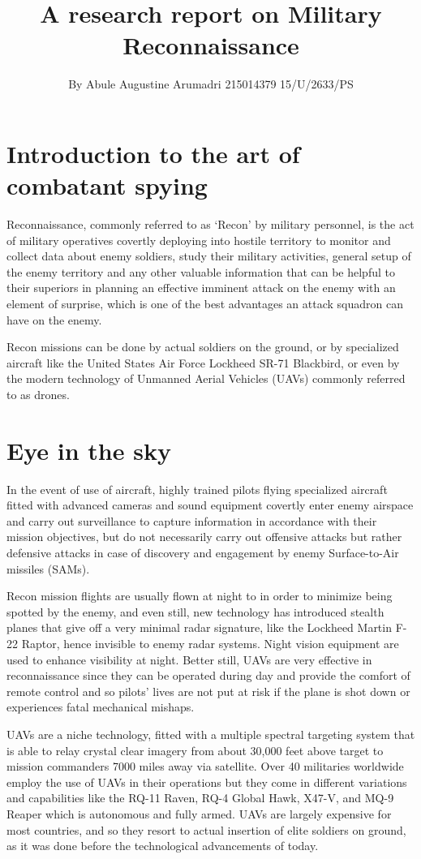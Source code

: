 \documentclass{article}
\title{A research report on Military Reconnaissance}
\author{By Abule Augustine Arumadri 215014379 15/U/2633/PS}
\date{}
\begin{document}
\maketitle
\tableofcontents
\section{Introduction to the art of combatant spying}
Reconnaissance, commonly referred to as ‘Recon’ by military personnel, is the act of military operatives covertly deploying into hostile territory to monitor and collect 
data about enemy soldiers, study their military activities, general setup of the enemy territory and any other valuable information that can be helpful to their superiors
 in planning an effective imminent attack on the enemy with an element of surprise, which is one of the best advantages an attack squadron can have on the enemy.

 Recon missions can be done by actual soldiers on the ground, or by specialized aircraft like the United States Air Force Lockheed SR-71 Blackbird, or
 even by the modern technology of Unmanned Aerial Vehicles (UAVs) commonly referred to as drones.


\section{Eye in the sky}
In the event of use of aircraft, highly trained pilots flying specialized aircraft fitted with advanced cameras and sound equipment covertly enter enemy airspace 
and carry out surveillance to capture information in accordance with their mission objectives, but do not necessarily carry out offensive attacks but rather defensive
 attacks in case of discovery and engagement by enemy Surface-to-Air missiles (SAMs).

 Recon mission flights are usually flown at night to in order to minimize being spotted
 by the enemy, and even still, new technology has introduced stealth planes that give off a very minimal radar signature, like the Lockheed Martin F-22 Raptor, hence invisible 
to enemy radar systems. Night vision equipment are used to enhance visibility at night. Better still, UAVs are very effective in reconnaissance since they can be operated
 during day and provide the comfort of remote control and so pilots’ lives are not put at risk if the plane is shot down or experiences fatal mechanical mishaps. 

UAVs are a niche technology, fitted with a multiple spectral targeting system that is able to relay crystal clear imagery from about 30,000 feet above target to mission 
commanders 7000 miles away via satellite. Over 40 militaries worldwide employ the use of UAVs in their operations but they come in different variations and capabilities
 like the RQ-11 Raven, RQ-4 Global Hawk, X47-V, and MQ-9 Reaper which is autonomous and fully armed. UAVs are largely expensive for most countries, and so they resort 
to actual insertion of elite soldiers on ground, as it was done before the technological advancements of today.
\end{document}
